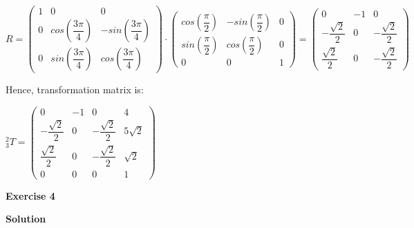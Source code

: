 \documentclass[12pt]{article}
\begin{document}
\begin{list}{)~}{}
$R=
\left(\begin{array}{ccc}
1 & 0 & 0 \\
0 & cos\left( \dfrac{3\pi}{4} \right) & -sin\left( \dfrac{3\pi}{4} \right)  \\
0 & sin\left(\dfrac{3\pi}{4} \right) & cos\left( \dfrac{3\pi}{4} \right)\end{array}\right)
\cdot
\left(\begin{array}{ccc}
cos\left( \dfrac{\pi}{2} \right) & -sin\left( \dfrac{\pi}{2}\right) & 0 \\
sin\left( \dfrac{\pi}{2}\right) & cos\left( \dfrac{\pi}{2}\right) & 0\\
0 & 0 & 1\end{array}\right)=
\left(\begin{array}{ccc}
0 & -1 & 0 \\
-\dfrac{\sqrt{2}}{2} & 0 & -\dfrac{\sqrt{2}}{2} \\
\dfrac{\sqrt{2}}{2} & 0 &  -\dfrac{\sqrt{2}}{2}\end{array}\right)$ 
\end{list}

Hence, transformation matrix is:

$_{3}^{2}T = \left(\begin{array}{cccc}
0 & -1 & 0 & 4 \\
-\dfrac{\sqrt{2}}{2} & 0 & -\dfrac{\sqrt{2}}{2} & 5\sqrt{2}\\
\dfrac{\sqrt{2}}{2} & 0 &  -\dfrac{\sqrt{2}}{2} & \sqrt{2}\\
0 & 0 & 0 & 1\end{array}\right)$

\medskip

\textbf{Exercise 4}		
		
\textbf{Solution}

\newpage
\end{document}

